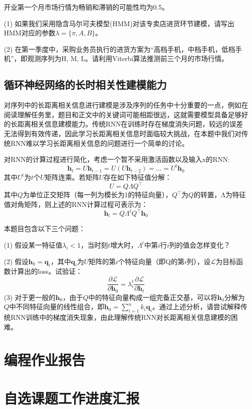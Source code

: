 \documentclass[a4paper]{article}
\begin{document}
\hspace{2em}开业第一个月市场行情为畅销和滞销的可能性均为0.5。

\vspace{3mm}
(1) 如果我们采用隐含马尔可夫模型(HMM)对该专卖店进货环节建模，{\color{blue}请写出HMM对应的参数$\lambda=\{\pi, A, B\}$}。

\vspace{3mm}
(2) 在第一季度中，采购业务员执行的进货方案为“高档手机，中档手机，低档手机”，即观测序列为H, M, L。{\color{blue}请利用Viterbi算法推测前三个月的市场行情}。


\subsection{循环神经网络的长时相关性建模能力}

\hspace{2em}对序列中的长距离相关信息进行建模是涉及序列的任务中十分重要的一点，例如在阅读理解任务里，题目和正文中的关键词可能相距很远，这就需要模型具备足够好的长距离相关信息建模能力。传统RNN在训练时存在梯度消失问题，较远的误差无法得到有效传递，因此学习长距离相关信息时面临较大挑战，在本题中我们对传统RNN难以学习长距离相关信息的问题进行一个简单的讨论。

\hspace{2em}对RNN的计算过程进行简化，考虑一个暂不采用激活函数以及输入x的RNN:
\begin{equation*}
    \bm{h}_t = U\bm{h}_{t-1} = U \left( U\bm{h}_{t-2} \right) = ... = U^t\bm{h}_0
\end{equation*}
\hspace{2em}其中$U^t$为$t$个$U$矩阵连乘。若矩阵$U$存在如下特征值分解：
\begin{equation*}
    U = Q \Lambda Q^\top
\end{equation*}
\hspace{2em}其中$Q$为单位正交矩阵（每一列为模长为1的特征向量），$Q^\top$为$Q$的转置，Λ为特征值对角矩阵，则上述的RNN计算过程可表示为：
\begin{equation*}
    \bm{h}_t = Q \Lambda^t Q^\top \bm{h}_0
\end{equation*}

\vspace{3mm}
本题目包含以下三个问题：

(1) 假设某一特征值$\lambda_i < 1$，{\color{blue}当时刻$t$增大时，$\Lambda^t$中第$i$行$i$列的值会怎样变化？}

(2) 假设$\bm{h}_0=\bm{q}_i$，其中$\bm{q}_i$为$U$矩阵的第$i$个特征向量（即Q的第$i$列），设$\mathcal{L}$为目标函数计算出的loss。{\color{blue}试验证：
\begin{equation*}
    \frac{\partial \mathcal{L}}{\partial \bm{h}_0} = \lambda_i^t \frac{\partial \mathcal{L}}{\partial \bm{h}_t}
\end{equation*}}
(3) 对于更一般的$\bm{h}_0$，由于$Q$中的特征向量构成一组完备正交基，可以将$\bm{h}_0$分解为$Q$中不同特征向量的线性组合，即$\bm{h}_0=\sum_{i=1}^{n}k_i\bm{q}_i$。通过上述分析，{\color{blue}请尝试解释传统RNN训练中的梯度消失现象}，由此理解传统RNN对长距离相关信息建模的困难。



\section{编程作业报告}
\section{自选课题工作进度汇报}
\end{document}
